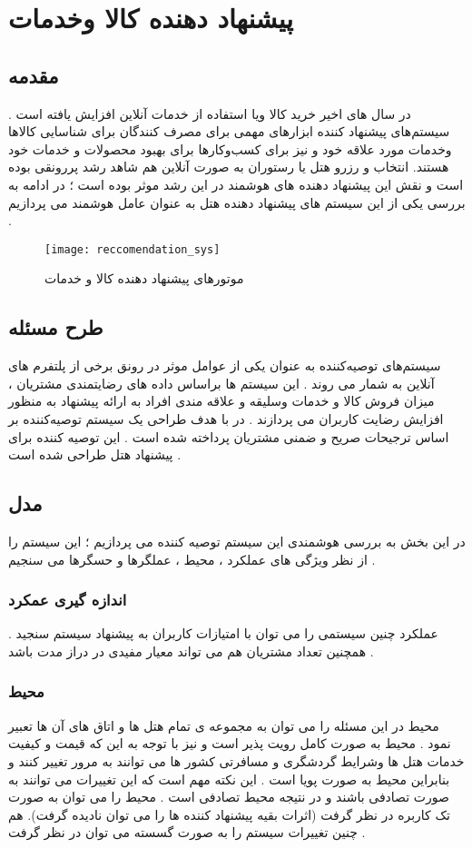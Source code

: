 
\chapter{پیشنهاد دهنده کالا وخدمات }
\section{مقدمه}

 در سال های اخیر خرید کالا ویا استفاده از خدمات آنلاین افزایش یافته است . 
سیستم‌های پیشنهاد ‌کننده ابزارهای مهمی برای مصرف کنندگان برای شناسایی کالاها وخدمات مورد علاقه خود و نیز برای کسب‌وکارها برای بهبود محصولات و خدمات خود هستند.
انتخاب و رزرو هتل 
 \cite{abbasi2019grouping}
یا رستوران
\cite{asani2021restaurant}
به صورت آنلاین هم شاهد رشد پررونقی بوده است و نقش این پیشنهاد دهنده های هوشمند در این رشد موثر بوده است ؛ در ادامه به بررسی یکی از این سیستم های پیشنهاد دهنده هتل به عنوان عامل هوشمند می پردازیم . 
\begin{figure}[h]
	\texttt{[image: reccomendation\_sys]}
	\centering
	\caption{موتورهای پیشنهاد دهنده کالا و خدمات}
	\cite{Naveennomidl}
	\label{rec_sys:fig1}
\end{figure} 
\section{طرح مسئله}
سیستم‌های توصیه‌کننده به عنوان یکی از عوامل موثر در رونق برخی از پلتفرم های آنلاین به شمار می روند . این سیستم ها براساس داده های رضایتمندی مشتریان ، میزان فروش کالا و خدمات وسلیقه و علاقه مندی افراد به ارائه پیشنهاد به منظور افزایش رضایت کاربران می پردازند . در 
 \cite{abbasi2019grouping}
 با هدف طراحی یک سیستم توصیه‌کننده بر اساس ترجیحات صریح و ضمنی مشتریان پرداخته شده است . این توصیه کننده برای پیشنهاد هتل طراحی شده است .
\section{مدل} 
در این بخش به بررسی هوشمندی این سیستم توصیه کننده می پردازیم ؛ این سیستم را از نظر ویژگی های عملکرد ،  محیط ، عملگرها و حسگرها می سنجیم .
\subsection{اندازه گیری عمکرد} 
عملکرد چنین سیستمی را  می توان با امتیازات کاربران به پیشنهاد سیستم سنجید . همچنین تعداد مشتریان هم می تواند معیار مفیدی در دراز مدت باشد .
\subsection{محیط}
محیط در این مسئله را می توان به مجموعه ی تمام هتل ها و اتاق های آن ها تعبیر نمود .
محیط به صورت کامل رویت پذیر
است و نیز با توجه به این که قیمت و کیفیت خدمات هتل ها وشرایط گردشگری و مسافرتی کشور ها می توانند به مرور تغییر کنند و بنابراین محیط  به صورت پویا است . این نکته مهم است که این تغییرات می توانند به صورت تصادفی باشند و در نتیجه محیط تصادفی است . محیط را می توان به صورت تک کاربره در نظر گرفت (اثرات بقیه پیشنهاد کننده ها را می توان نادیده گرفت). 
هم چنین تغییرات سیستم را  به صورت گسسته می توان در نظر گرفت .


